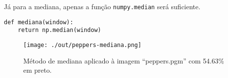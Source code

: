 \documentclass[twocolumn, 10pt]{article}
\begin{document}
Já para a mediana, apenas a função \texttt{numpy.median} será suficiente.
\begin{verbatim}
def mediana(window):
    return np.median(window)
\end{verbatim}
\begin{figure}[htbp]
\centering
\texttt{[image: ./out/peppers-mediana.png]}
\caption{Método de mediana aplicado à imagem ``peppers.pgm'' com 54.63\% em preto.}
\end{figure}
\end{document}
